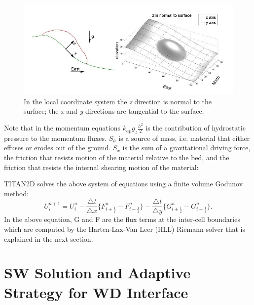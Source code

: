 \documentclass[review]{elsarticle}
\begin{document}
\begin{figure}[!t]
        \begin{center}
                 \includegraphics[width=1\textwidth]{IMAGES/1.jpg}
                \caption{In the local coordinate system the {\itshape z} direction is normal to the surface; 
                the {\itshape x} and {\itshape y} directions are tangential to the surface.}
                \label{xzeast}
        \end{center}
\end{figure}
Note that in the momentum equations $k_{ap}g_z\frac{h^2}{2}$ is the contribution of hydrostatic 
pressure to the momentum fluxes. $S_h$ is a source of mass, i.e. 
material that either effuses or erodes out of the ground. $S_x$ is 
the sum of a gravitational driving force, the friction that resists motion 
of the material relative to the bed, and the friction that resists the 
internal shearing motion of the material:

TITAN2D solves the above system of equations using a finite volume Godunov method:
\begin{equation}
   \label{integrator}
   U_i^{n+1} = U_i^n - \frac{\bigtriangleup t}{\bigtriangleup x} \{F_{i+\frac{1}{2}}^n - F_{i-\frac{1}{2}}^n \}
   - \frac{\bigtriangleup t}{\bigtriangleup y} \{G_{i+\frac{1}{2}}^n - G_{i-\frac{1}{2}}^n \}.
\end{equation}
In the above equation, G and F are the flux terms at the inter-cell boundaries which are computed by the Harten-Lax-Van Leer (HLL) \cite{Toro2009riemann} Riemann solver that is explained 
in the next section.
\section{SW Solution and Adaptive Strategy for WD Interface }
\end{document}
